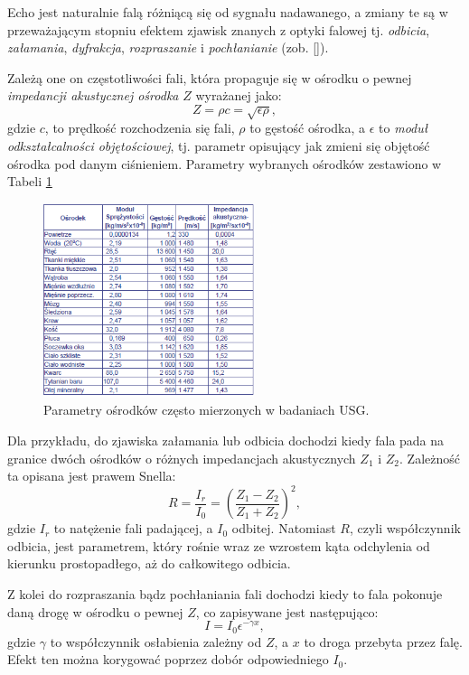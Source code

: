 Echo jest naturalnie falą różniącą się od sygnału nadawanego, a zmiany te są w przeważającym stopniu efektem zjawisk znanych z optyki falowej tj. \textit{odbicia}, \textit{załamania}, \textit{dyfrakcja}, \textit{rozpraszanie} i \textit{pochłanianie} (zob. []).

Zależą one on częstotliwości fali, która propaguje się w ośrodku o pewnej \textit{impedancji akustycznej ośrodka} $Z$ wyrażanej jako:
\begin{equation}
Z = \rho c = \sqrt{\epsilon \rho},
\end{equation}
gdzie $c$, to prędkość rozchodzenia się fali, $\rho$ to gęstość ośrodka, a $\epsilon$ to \textit{moduł odkształcalności objętościowej}, tj. parametr opisujący jak zmieni się objętość ośrodka pod danym ciśnieniem. Parametry wybranych ośrodków zestawiono w Tabeli \ref{USG-params} 
\begin{figure}[h!]
	\centering
	\includegraphics[width=0.55\textwidth]{figures/USG-params.png}
	\caption{Parametry ośrodków często mierzonych w badaniach USG.}
	\label{USG-params}
\end{figure}

Dla przykładu, do zjawiska załamania lub odbicia dochodzi kiedy fala pada na granice dwóch ośrodków o różnych impedancjach akustycznych $Z_1$ i $Z_2$. Zależność ta opisana jest prawem Snella:
\begin{equation}
R = \frac{I_r}{I_0} = \left(\frac{Z_1-Z_2}{Z_1+Z_2}\right)^2,
\end{equation}
gdzie $I_r$ to natężenie fali padającej, a $I_0$ odbitej. Natomiast $R$, czyli współczynnik odbicia, jest parametrem, który rośnie wraz ze wzrostem kąta odchylenia od kierunku prostopadłego, aż do całkowitego odbicia.

Z kolei do rozpraszania bądz pochłaniania fali dochodzi kiedy to fala pokonuje daną drogę w ośrodku o pewnej $Z$, co zapisywane jest następująco:
\begin{equation}
I=I_0 \epsilon^{-\gamma x},
\end{equation}
gdzie $\gamma$ to współczynnik osłabienia zależny od $Z$, a $x$ to droga przebyta przez falę. Efekt ten można korygować poprzez dobór odpowiedniego $I_0$.


